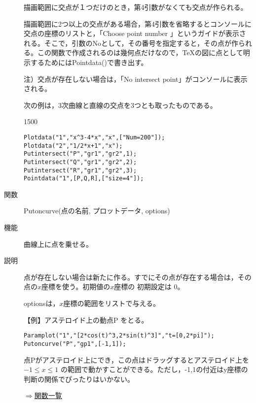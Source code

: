 \documentclass[papersize,a4paper,10pt,uplatex]{jsarticle}
\begin{document}
\begin{description}
描画範囲に交点が１つだけのとき，第4引数がなくても交点が作られる。

描画範囲に2つ以上の交点がある場合，第4引数を省略するとコンソールに交点の座標のリストと，「Choose point number 」というガイドが表示される。そこで，引数のNoとして，その番号を指定すると，その点が作られる。この関数で作成されるのは幾何点だけなので，\TeX の図に点として明示するためにはPointdata()で書き出す。

注）交点が存在しない場合は，「No intersect point」がコンソールに表示される。

\newpage

次の例は，3次曲線と直線の交点を3つとも取ったものである。

\begin{layer}{150}{0}
\end{layer}

\begin{verbatim}
Plotdata("1","x^3-4*x","x",["Num=200"]);
Plotdata("2","1/2*x+1","x");
Putintersect("P","gr1","gr2",1);
Putintersect("Q","gr1","gr2",2);
Putintersect("R","gr1","gr2",3);
Pointdata("1",[P,Q,R],["size=4"]);
\end{verbatim}


\vspace{\baselineskip}
\hypertarget{putoncurve}{}
\item[関数]Putoncurve(点の名前, プロットデータ, options)
\item[機能]曲線上に点を乗せる。
\item[説明]点が存在しない場合は新たに作る。すでにその点が存在する場合は，その点の$x$座標を使う。初期値の$x$座標の 初期設定は 0。

optionsは，$x$座標の範囲をリストで与える。

\vspace{\baselineskip}
【例】アステロイド上の動点P をとる。
\begin{verbatim}
Paramplot("1","[2*cos(t)^3,2*sin(t)^3]","t=[0,2*pi]");
Putoncurve("P","gp1",[-1,1]); 
\end{verbatim}
点Pがアステロイド上にでき，この点はドラッグするとアステロイド上を $-1 \leq x\leq 1$ の範囲で動かすことができる。ただし，-1,1の付近はy座標の判断の関係でぴったりはいかない。

 \begin{center} \scalebox{0.9}{} \end{center}

\begin{flushright}\hyperlink{functionlist}{$\Rightarrow$関数一覧}\end{flushright}


\end{description}
\end{document}
